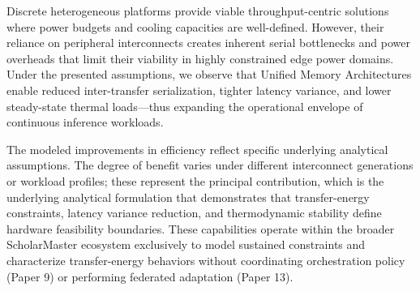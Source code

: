 \documentclass[conference]{IEEEtran}
\begin{document}
Discrete heterogeneous platforms provide viable throughput-centric solutions where power budgets and cooling capacities are well-defined. However, their reliance on peripheral interconnects creates inherent serial bottlenecks and power overheads that limit their viability in highly constrained edge power domains. Under the presented assumptions, we observe that Unified Memory Architectures enable reduced inter-transfer serialization, tighter latency variance, and lower steady-state thermal loads---thus expanding the operational envelope of continuous inference workloads.

The modeled improvements in efficiency reflect specific underlying analytical assumptions. The degree of benefit varies under different interconnect generations or workload profiles; these represent the principal contribution, which is the underlying analytical formulation that demonstrates that transfer-energy constraints, latency variance reduction, and thermodynamic stability define hardware feasibility boundaries. These capabilities operate within the broader ScholarMaster ecosystem exclusively to model sustained constraints and characterize transfer-energy behaviors without coordinating orchestration policy (Paper 9) or performing federated adaptation (Paper 13).
\end{document}
